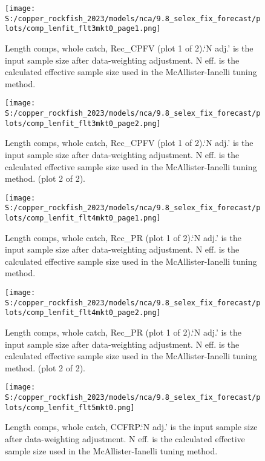 \documentclass[11pt,
  english,
  letterpaper,
]{article}
\begin{document}
\begin{figure}
\centering
\texttt{[image: S:/copper\_rockfish\_2023/models/nca/9.8\_selex\_fix\_forecast/plots/comp\_lenfit\_flt3mkt0\_page1.png]}
\caption{Length comps, whole catch, Rec\_CPFV (plot 1 of 2).`N adj.' is the input sample size after data-weighting adjustment. N eff. is the calculated effective sample size used in the McAllister-Ianelli tuning method.\label{fig:comp_lenfit_flt3mkt0_page1}}
\end{figure}

\begin{figure}
\centering
\texttt{[image: S:/copper\_rockfish\_2023/models/nca/9.8\_selex\_fix\_forecast/plots/comp\_lenfit\_flt3mkt0\_page2.png]}
\caption{Length comps, whole catch, Rec\_CPFV (plot 1 of 2).`N adj.' is the input sample size after data-weighting adjustment. N eff. is the calculated effective sample size used in the McAllister-Ianelli tuning method. (plot 2 of 2).\label{fig:comp_lenfit_flt3mkt0_page2}}
\end{figure}

\begin{figure}
\centering
\texttt{[image: S:/copper\_rockfish\_2023/models/nca/9.8\_selex\_fix\_forecast/plots/comp\_lenfit\_flt4mkt0\_page1.png]}
\caption{Length comps, whole catch, Rec\_PR (plot 1 of 2).`N adj.' is the input sample size after data-weighting adjustment. N eff. is the calculated effective sample size used in the McAllister-Ianelli tuning method.\label{fig:comp_lenfit_flt4mkt0_page1}}
\end{figure}

\begin{figure}
\centering
\texttt{[image: S:/copper\_rockfish\_2023/models/nca/9.8\_selex\_fix\_forecast/plots/comp\_lenfit\_flt4mkt0\_page2.png]}
\caption{Length comps, whole catch, Rec\_PR (plot 1 of 2).`N adj.' is the input sample size after data-weighting adjustment. N eff. is the calculated effective sample size used in the McAllister-Ianelli tuning method. (plot 2 of 2).\label{fig:comp_lenfit_flt4mkt0_page2}}
\end{figure}

\begin{figure}
\centering
\texttt{[image: S:/copper\_rockfish\_2023/models/nca/9.8\_selex\_fix\_forecast/plots/comp\_lenfit\_flt5mkt0.png]}
\caption{Length comps, whole catch, CCFRP.`N adj.' is the input sample size after data-weighting adjustment. N eff. is the calculated effective sample size used in the McAllister-Ianelli tuning method.\label{fig:comp_lenfit_flt5mkt0}}
\end{figure}
\end{document}
